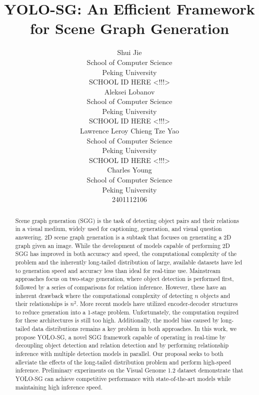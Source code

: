 \documentclass{article}
\title{YOLO-SG: An Efficient Framework for Scene Graph Generation}
\author{
  Shui Jie \\
  School of Computer Science\\
  Peking University\\
  SCHOOL ID HERE <!!!> \\
  \And
  Aleksei Lobanov \\
  School of Computer Science\\
  Peking University\\
  SCHOOL ID HERE <!!!> \\
  \AND
  Lawrence Leroy Chieng Tze Yao \\
  School of Computer Science\\
  Peking University\\
  SCHOOL ID HERE <!!!> \\
  \And
  Charles Young \\
  School of Computer Science\\
  Peking University\\
  2401112106
}
\begin{document}
\maketitle


\begin{abstract}
    Scene graph generation (SGG) is the task of detecting object pairs and their relations in a visual medium, widely used for captioning, generation, and visual question answering. 2D scene graph generation is a subtask that focuses on generating a 2D graph given an image. While the development of models capable of performing 2D SGG has improved in both accuracy and speed, the computational complexity of the problem and the inherently long-tailed distribution of large, available datasets have led to generation speed and accuracy less than ideal for real-time use. Mainstream approaches focus on two-stage generation, where object detection is performed first, followed by a series of comparisons for relation inference. However, these have an inherent drawback where the computational complexity of detecting $n$ objects and their relationships is $n^2$. More recent models have utilized encoder-decoder structures to reduce generation into a 1-stage problem. Unfortunately, the computation required for these architectures is still too high. Additionally, the model bias caused by long-tailed data distributions remains a key problem in both approaches. In this work, we propose YOLO-SG, a novel SGG framework capable of operating in real-time by decoupling object detection and relation detection and by performing relationship inference with multiple detection models in parallel. Our proposal seeks to both alleviate the effects of the long-tailed distribution problem and perform high-speed inference. Preliminary experiments on the Visual Genome 1.2 dataset demonstrate that YOLO-SG can achieve competitive performance with state-of-the-art models while maintaining high inference speed.
\end{abstract}
\end{document}
